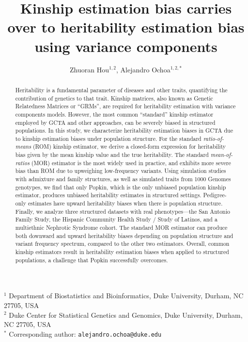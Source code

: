 \documentclass[11pt]{article}
\title{\Large \textbf{Kinship estimation bias carries over to heritability estimation bias using variance components}}
\author{Zhuoran Hou$^{1,2}$, Alejandro Ochoa$^{1,2,*}$}
\date{}
\begin{document}
\maketitle

\noindent
$^1$ Department of Biostatistics and Bioinformatics, Duke University, Durham, NC 27705, USA \\
$^2$ Duke Center for Statistical Genetics and Genomics, Duke University, Durham, NC 27705, USA \\
$^*$ Corresponding author: \texttt{alejandro.ochoa@duke.edu}

\begin{abstract}
Heritability is a fundamental parameter of diseases and other traits, quantifying the contribution of genetics to that trait. Kinship matrices, also known as Genetic Relatedness Matrices or “GRMs”, are required for heritability estimation with variance components models. However, the most common “standard” kinship estimator employed by GCTA and other approaches, can be severely biased in structured populations. 
In this study, we characterize heritability estimation biases in GCTA due to kinship estimation biases under population structure.
For the standard \textit{ratio-of-means} (ROM) kinship estimator, we derive a closed-form expression for heritability bias given by the mean kinship value and the true heritability.
The standard \textit{mean-of-ratios} (MOR) estimator is the most widely used in practice, and exhibits more severe bias than ROM due to upweighing low-frequency variants. Using simulation studies with admixture and family structures, as well as simulated traits from 1000 Genomes genotypes, we find that only Popkin, which is the only unbiased population kinship estimator, produces unbiased heritability estimates in structured settings.
Pedigree-only estimates have upward heritability biases when there is population structure.  Finally, we analyze three structured datasets with real phenotypes—the San Antonio Family Study, the Hispanic Community Health Study / Study of Latinos, and a multiethnic Nephrotic Syndrome cohort. The standard MOR estimator can produce both downward and upward heritability biases depending on population structure and variant frequency spectrum, compared to the other two estimators. Overall, common kinship estimators result in heritability estimation biases when applied to structured populations, a challenge that Popkin successfully overcomes.
\end{abstract}

\end{document}
